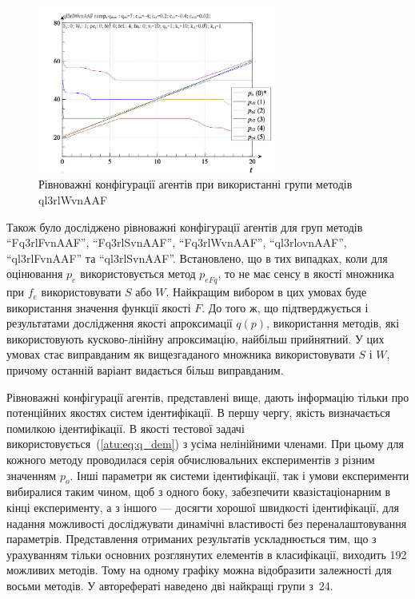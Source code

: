 \documentclass[a4paper,13pt]{atuaref}
\begin{document}
\begin{figure}[htb!]
  \centerline{
    \includegraphics[width=0.70\textwidth]{p3/p/ramp/qls-p_t_pi_ql3rlWvnAAF_ramp.png}
  }
  \caption{Рівноважні конфігурації агентів при використанні групи методів ql3rlWvnAAF}
  \label{atu:f:qls_ramp_ql3rlWvnAAF}
\end{figure}


Також було досліджено рівноважні конфігурації агентів для
груп методів
``Fq3rlFvnAAF'',
``Fq3rlSvnAAF'',
``Fq3rlWvnAAF'',
``ql3rlovnAAF'',
``ql3rlFvnAAF'' та
``ql3rlSvnAAF''.
Встановлено, що в тих випадках, коли для оцінювання $ p_e $ використовується
метод $ p_{eFq} $, то не має сенсу в якості множника при $ f_e $
використовувати $ S $ або $ W $. Найкращим вибором в цих умовах буде
використання значення функції якості $ F $. До того ж, що підтверджується і
результатами дослідження якості апроксимації $ q (p) $, використання методів,
які використовують кусково-лінійну апроксимацію, найбільш прийнятний. У цих
умовах стає виправданим як вищезгаданого множника використовувати
$ S $ і $ W$, причому останній варіант видається більш виправданим.


Рівноважні конфігурації агентів, представлені вище, дають інформацію тільки про
потенційних якостях систем ідентифікації. В першу чергу, якість визначається
помилкою ідентифікації. В якості тестової задачі
використовується~(\ref{atu:eq:q_dem}) з усіма нелінійними членами. При цьому для кожного методу
проводилася серія обчислювальних експериментів з різним значенням $ p_o $. Інші
параметри як системи ідентифікації, так і умови експерименти вибиралися таким
чином, щоб з одного боку, забезпечити квазістаціонарним в кінці експерименту, а
з іншого --- досягти хорошої швидкості ідентифікації, для надання можливості
досліджувати динамічні властивості без переналаштовування параметрів.
Представлення отриманих результатів ускладнюється тим, що з урахуванням тільки
основних розглянутих елементів в класифікації, виходить 192 можливих методів.
Тому на одному графіку можна відобразити залежності для восьми методів.
У авторефераті наведено дві найкращі групи з~24.
\end{document}

